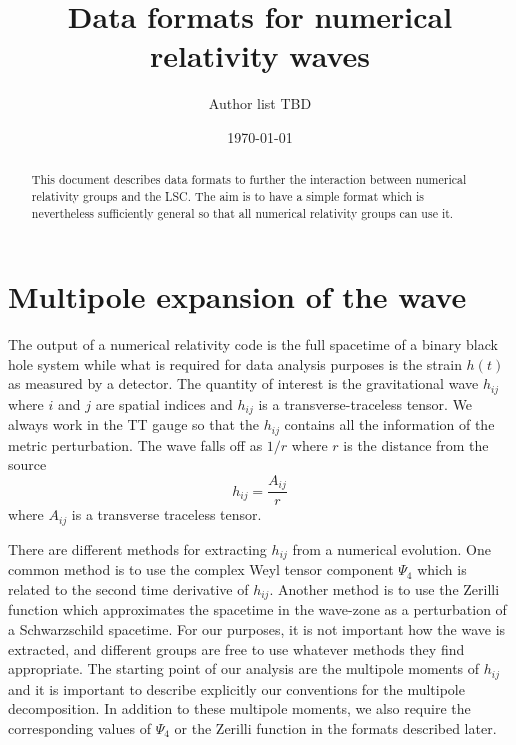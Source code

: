 \documentclass[amsmath,amssymb]{article}
\begin{document}
\title{Data formats for numerical relativity waves}
\date{\today}
\author{Author list TBD}
\maketitle

\begin{abstract}
This document describes data formats to further the interaction
between numerical relativity groups and the LSC. The aim is to have a
simple format which is nevertheless sufficiently general so that all
numerical relativity groups can use it.  
\end{abstract}

\section{Multipole expansion of the wave}
\label{sec:multipoles}

The output of a numerical relativity code is the full spacetime of a
binary black hole system while what is required for data analysis
purposes is the strain $h(t)$ as measured by a detector.  The quantity
of interest is the gravitational wave $h_{ij}$ where $i$ and $j$ are
spatial indices and $h_{ij}$ is a transverse-traceless tensor.  We
always work in the TT gauge so that the $h_{ij}$ contains all the
information of the metric perturbation.  The wave falls off as $1/r$
where $r$ is the distance from the source
\begin{equation}
  \label{eq:1}
  h_{ij} = \frac{A_{ij}}{r} 
\end{equation}
where $A_{ij}$ is a transverse traceless tensor.  

There are different methods for extracting $h_{ij}$ from a numerical
evolution.  One common method is to use the complex Weyl tensor
component $\Psi_4$ which is related to the second time derivative of
$h_{ij}$. Another method is to use the Zerilli function which
approximates the spacetime in the wave-zone as a perturbation of a
Schwarzschild spacetime.  For our purposes, it is not important how
the wave is extracted, and different groups are free to use whatever
methods they find appropriate.  The starting point of our analysis are
the multipole moments of $h_{ij}$ and it is important to describe
explicitly our conventions for the multipole decomposition.  In
addition to these multipole moments, we also require the corresponding
values of $\Psi_4$ or the Zerilli function in the formats described
later. 
\end{document}
